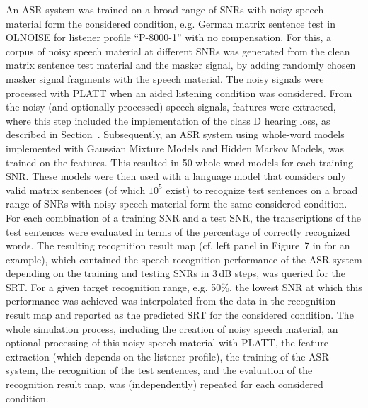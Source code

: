 \documentclass[10pt,a4paper,twocolumn]{article}
\begin{document}
An ASR system was trained on a broad range of SNRs with noisy speech material form the considered condition, e.g. German matrix sentence test in OLNOISE for listener profile \enquote{P-8000-1} with no compensation.
%
For this, a corpus of noisy speech material at different SNRs was generated from the clean matrix sentence test material and the masker signal, by adding randomly chosen masker signal fragments with the speech material.
%
The noisy signals were processed with PLATT when an aided listening condition was considered.
%
From the noisy (and optionally processed) speech signals, features were extracted, where this step included the implementation of the class D hearing loss, as described in Section~.
%
Subsequently, an ASR system using whole-word models implemented with Gaussian Mixture Models and Hidden Markov Models, was trained on the features.
%
This resulted in 50 whole-word models for each training SNR.
%
These models were then used with a language model that considers only valid matrix sentences (of which $10^5$ exist) to recognize test sentences on a broad range of SNRs with noisy speech material form the same considered condition.
%
For each combination of a training SNR and a test SNR, the transcriptions of the test sentences were evaluated in terms of the percentage of correctly recognized words.
%
The resulting recognition result map (cf. left panel in Figure~7 in \cite{schaedler2016a} for an example), which contained the speech recognition performance of the ASR system depending on the training and testing SNRs in 3\,dB steps, was queried for the SRT.
%
For a given target recognition range, e.g. 50\%, the lowest SNR at which this performance was achieved was interpolated from the data in the recognition result map and reported as the predicted SRT for the considered condition.
%
The whole simulation process, including the creation of noisy speech material, an optional processing of this noisy speech material with PLATT, the feature extraction (which depends on the listener profile), the training of the ASR system, the recognition of the test sentences, and the evaluation of the recognition result map, was (independently) repeated for each considered condition.

\end{document}
